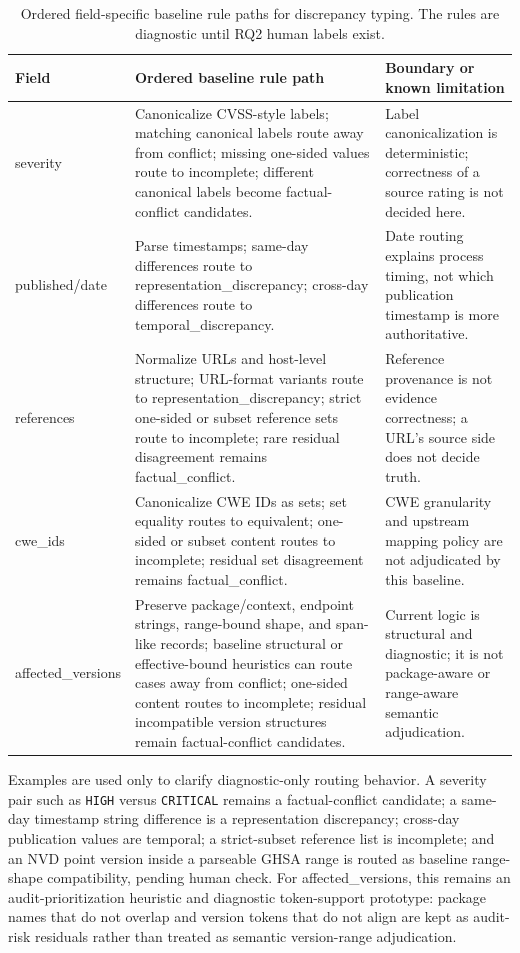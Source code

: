 \begin{table}[!htbp]
\centering
\setlength{\tabcolsep}{3pt}
\footnotesize
\caption{Ordered field-specific baseline rule paths for discrepancy typing. The rules are diagnostic until RQ2 human labels exist.}
\label{tab:03-method-discrepancy-typing-1}
\begin{tabularx}{\textwidth}{>{\raggedright\arraybackslash}p{}>{\raggedright\arraybackslash}X>{\raggedright\arraybackslash}X}
\toprule
Field & Ordered baseline rule path & Boundary or known limitation \\
\midrule
severity & Canonicalize CVSS-style labels; matching canonical labels route away from conflict; missing one-sided values route to incomplete; different canonical labels become factual-conflict candidates. & Label canonicalization is deterministic; correctness of a source rating is not decided here. \\
published/date & Parse timestamps; same-day differences route to representation\_discrepancy; cross-day differences route to temporal\_discrepancy. & Date routing explains process timing, not which publication timestamp is more authoritative. \\
references & Normalize URLs and host-level structure; URL-format variants route to representation\_discrepancy; strict one-sided or subset reference sets route to incomplete; rare residual disagreement remains factual\_conflict. & Reference provenance is not evidence correctness; a URL's source side does not decide truth. \\
cwe\_ids & Canonicalize CWE IDs as sets; set equality routes to equivalent; one-sided or subset content routes to incomplete; residual set disagreement remains factual\_conflict. & CWE granularity and upstream mapping policy are not adjudicated by this baseline. \\
affected\_versions & Preserve package/context, endpoint strings, range-bound shape, and span-like records; baseline structural or effective-bound heuristics can route cases away from conflict; one-sided content routes to incomplete; residual incompatible version structures remain factual-conflict candidates. & Current logic is structural and diagnostic; it is not package-aware or range-aware semantic adjudication. \\
\bottomrule
\end{tabularx}
\end{table}

Examples are used only to clarify diagnostic-only routing behavior. A severity pair such as \texttt{HIGH} versus \texttt{CRITICAL} remains a factual-conflict candidate; a same-day timestamp string difference is a representation discrepancy; cross-day publication values are temporal; a strict-subset reference list is incomplete; and an NVD point version inside a parseable GHSA range is routed as baseline range-shape compatibility, pending human check. For affected\_versions, this remains an audit-prioritization heuristic and diagnostic token-support prototype: package names that do not overlap and version tokens that do not align are kept as audit-risk residuals rather than treated as semantic version-range adjudication.

